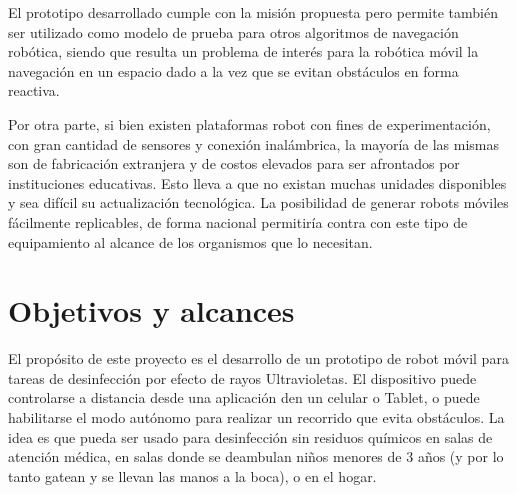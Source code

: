 El prototipo desarrollado cumple con la misión propuesta pero permite también ser utilizado como modelo de prueba para otros algoritmos de navegación robótica, siendo que resulta un problema de interés para la robótica móvil la navegación en un espacio dado a la vez que se evitan obstáculos en forma reactiva. 

Por otra parte, si bien existen plataformas robot con fines de experimentación, con gran cantidad de sensores y conexión inalámbrica, la mayoría de las  mismas son de fabricación extranjera y de costos elevados para ser afrontados por instituciones educativas. Esto lleva a que no existan muchas unidades disponibles y sea difícil su actualización tecnológica. La posibilidad de generar robots móviles fácilmente replicables, de forma nacional permitiría contra con este tipo de equipamiento al alcance de los organismos que lo necesitan.





\section{Objetivos y alcances}

El propósito de este proyecto es el desarrollo de un prototipo de robot móvil para tareas de desinfección por efecto de rayos Ultravioletas. El dispositivo puede controlarse a distancia desde una aplicación den un celular o Tablet, o puede habilitarse el modo autónomo para realizar un recorrido que evita obstáculos. 
La idea es que pueda ser usado para desinfección sin  residuos químicos en salas de atención médica, en salas donde se deambulan niños menores de 3 años (y por lo tanto gatean y se llevan las manos a la boca), o en el hogar. 




